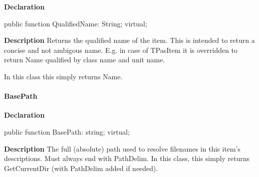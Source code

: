 \documentclass{report}
\newif\ifpdf
\begin{document}
\label{PasDoc_Items.TBaseItem-QualifiedName}
\begin{list}{}{
\setlength{\itemindent}{0cm}
\setlength{\listparindent}{0cm}
\setlength{\leftmargin}{\evensidemargin}
\addtolength{\leftmargin}{\tmplength}
\settowidth{\labelsep}{X}
\addtolength{\leftmargin}{\labelsep}
\setlength{\labelwidth}{\tmplength}
}
\item[\textbf{Declaration}\hfill]
\ifpdf
\begin{flushleft}
\fi
\begin{ttfamily}
public function QualifiedName: String; virtual;\end{ttfamily}

\ifpdf
\end{flushleft}
\fi

\par
\item[\textbf{Description}]
Returns the qualified name of the item. This is intended to return a concise and not ambigous name. E.g. in case of TPasItem it is overridden to return Name qualified by class name and unit name.

In this class this simply returns Name.

\end{list}
\paragraph*{BasePath}\hspace*{\fill}

\label{PasDoc_Items.TBaseItem-BasePath}
\begin{list}{}{
\setlength{\itemindent}{0cm}
\setlength{\listparindent}{0cm}
\setlength{\leftmargin}{\evensidemargin}
\addtolength{\leftmargin}{\tmplength}
\settowidth{\labelsep}{X}
\addtolength{\leftmargin}{\labelsep}
\setlength{\labelwidth}{\tmplength}
}
\item[\textbf{Declaration}\hfill]
\ifpdf
\begin{flushleft}
\fi
\begin{ttfamily}
public function BasePath: string; virtual;\end{ttfamily}

\ifpdf
\end{flushleft}
\fi

\par
\item[\textbf{Description}]
The full (absolute) path used to resolve filenames in this item's descriptions. Must always end with PathDelim. In this class, this simply returns GetCurrentDir (with PathDelim added if needed).

\end{list}
\ifpdf
\end{document}
